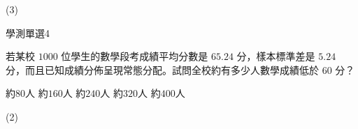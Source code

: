 \begin{QUESTIONS}
\begin{QUESTION}
\begin{QBODY}
        \end{QBODY}
        \begin{QFROMS}
        \end{QFROMS}
        \begin{QTAGS}\end{QTAGS}
        \begin{QANS}
            (3)
        \end{QANS}
        \begin{QSOLLIST}
        \end{QSOLLIST}
        \begin{QEMPTYSPACE}
        \end{QEMPTYSPACE}
    \end{QUESTION}
    \begin{QUESTION}
        \begin{ExamInfo}{91}{學測}{單選}{4}
        \end{ExamInfo}
        \begin{ExamAnsRateInfo}{35}{60}{27}{18}
        \end{ExamAnsRateInfo}
        \begin{QBODY}
            若某校 $1000$ 位學生的數學段考成績平均分數是 $65.24$ 分，樣本標準差是 $5.24$ 分，而且已知成績分佈呈現常態分配。試問全校約有多少人數學成績低於 $60$ 分？
            \begin{QOPS}
                \QOP 約$80$人  
                \QOP 約$160$人 
                \QOP 約$240$人 
                \QOP 約$320$人 
                \QOP 約$400$人
            \end{QOPS}
        \end{QBODY}
        \begin{QFROMS}
        \end{QFROMS}
        \begin{QTAGS}\end{QTAGS}
        \begin{QANS}
            (2)

\end{QANS}
\end{QUESTION}
\end{QUESTIONS}
